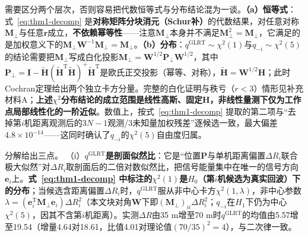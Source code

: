 \documentclass[UTF8,a4paper,zihao=-4]{ctexart}
\begin{document}
需要区分两个层次，否则容易把代数恒等式与分布结论混为一谈。\textbf{（a）恒等式}：式~\eqref{eq:thm1-decomp} 是\textbf{对称矩阵分块消元（Schur补）}的代数结果，对任意对称\(\boldsymbol M_{\perp}\)与任意\(\boldsymbol r\)成立，\textbf{不依赖幂等性}——注意\(\boldsymbol M_{\perp}\)本身并不满足\(\boldsymbol M_{\perp}^2=\boldsymbol M_{\perp}\)，它满足的是加权意义下的\(\boldsymbol M_{\perp}\boldsymbol W^{-1}\boldsymbol M_{\perp}=\boldsymbol M_{\perp}\)。\textbf{（b）分布}：\(q^{\mathrm{GLRT}}\sim\chi^2(1)\)与\(q_{-i}\sim\chi^2(5)\)的结论需要把\(\boldsymbol M_{\perp}\)写成白化投影\(\boldsymbol M_{\perp}=\boldsymbol W^{1/2}\boldsymbol P_{\perp}\boldsymbol W^{1/2}\)，其中\(\boldsymbol P_{\perp}=\boldsymbol I-\widetilde{\boldsymbol H}(\widetilde{\boldsymbol H}^{\mathrm T}\widetilde{\boldsymbol H})^{+}\widetilde{\boldsymbol H}^{\mathrm T}\)是欧氏正交投影（幂等、对称），\(\widetilde{\boldsymbol H}=\boldsymbol W^{1/2}\boldsymbol H\)；此时Cochran定理给出两个独立卡方分量。完整的白化证明与秩亏（\(r<3\)）情形见补充材料A；\textbf{上述\(\chi^2\)分布结论的成立范围是线性高斯、固定\(\boldsymbol H\)，非线性量测下仅为工作点局部线性化的一阶近似}。数值上，按式~\eqref{eq:thm1-decomp} 提取的第二项与“去掉第\(i\)机距离观测后的\(3N-1\)观测/3未知量加权残差”逐候选一致，最大偏差\(4.8\times10^{-14}\)——这同时确认了\(q_{-i}\)的\(\chi^2(5)\)自由度归属。

分解给出三点。
（i）\textbf{\(q^{\mathrm{GLRT}}\)是剖面似然比}：它是“位置\(\boldsymbol P\)与单机距离偏置\(\Delta R_i\)联合极大似然”对\(\Delta R_i\)取剖面后的二倍对数似然比，把信号能量集中在唯一的信号方向\(\boldsymbol e_i\)上。\textbf{式~\eqref{eq:thm1-decomp} 中标注的\(\chi^2(1)\)是\(H_0\)（第\(i\)机候选为真实回波）下的分布}；当候选含距离偏置\(\Delta R_i\)时，\(q^{\mathrm{GLRT}}\)服从非中心卡方\(\chi^2(1,\lambda)\)，非中心参数\(\lambda=(\boldsymbol e_i^{\mathrm T}\boldsymbol M_{\perp}\boldsymbol e_i)\Delta R_i^2\)（本文块对角\(\boldsymbol W\)下即\((\boldsymbol M_{\perp})_{ii}\Delta R_i^2\)；\(q_{-i}\)在\(H_1\)下仍为中心\(\chi^2(5)\)，因其不含第\(i\)机距离）。实测\(\Delta R\)由35 m增至70 m时\(q^{\mathrm{GLRT}}\)的均值由5.57增至19.54（增量4.64对18.61，比值4.01对理论值\((70/35)^2=4\)），与二次律一致。
\end{document}

